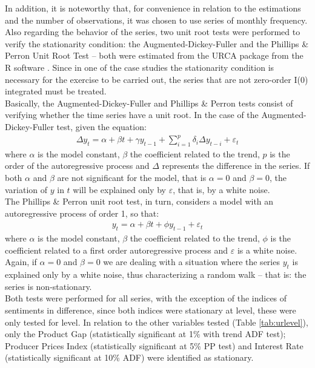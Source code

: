 In addition, it is noteworthy that, for convenience in relation to the estimations and the number of observations, it was chosen to use series of monthly frequency.\\

Also regarding the behavior of the series, two unit root tests were performed to verify the stationarity condition: the Augmented-Dickey-Fuller \cite[]{cheung1995lag} and the Phillips \& Perron Unit Root Test \cite[]{phillips1988testing} -- both were estimated from the URCA package \cite[]{pfaff2008book} from the R software \cite[]{rcran}. Since in one of the case studies the stationarity condition is necessary for the exercise to be carried out, the series that are not zero-order I(0) integrated must be treated.\\

Basically, the Augmented-Dickey-Fuller and Phillips \& Perron tests consist of verifying whether the time series have a unit root. In the case of the Augmented-Dickey-Fuller test, given the equation:
\begin{align}
    \Delta y_t = \alpha + \beta t + \gamma y_{t-1} + \sum_{i=1}^{p} \delta_i \Delta y_{t-i} + \varepsilon_t
\end{align}
where $\alpha$ is the model constant, $\beta$ the coefficient related to the trend, $p$ is the order of the autoregressive process and $\Delta$ represents the difference in the series. If both $\alpha$ and $\beta$ are not significant for the model, that is $\alpha = 0$ and $\beta = 0$, the variation of $y$ in $t$ will be explained only by $\varepsilon$, that is, by a white noise.\\

The Phillips \& Perron unit root test, in turn, considers a model with an autoregressive process of order 1, so that:
\begin{align}
    y_t = \alpha + \beta t + \phi y_{t-1} + \varepsilon_t
\end{align}
where $\alpha$ is the model constant, $\beta$ the coefficient related to the trend, $\phi$ is the coefficient related to a first order autoregressive process and $\varepsilon$ is a white noise. Again, if $\alpha=0$ and $\beta = 0$ we are dealing with a situation where the series $y_t$ is explained only by a white noise, thus characterizing a random walk -- that is: the series is non-stationary.\\

Both tests were performed for all series, with the exception of the indices of sentiments in difference, since both indices were stationary at level, these were only tested for level. In relation to the other variables tested (Table {\ref{tab:urlevel}}), only the Product Gap (statistically significant at 1\% with trend ADF test); Producer Prices Index (statistically significant at 5\% PP test) and Interest Rate (statistically significant
at 10\% ADF) were identified as stationary. 

